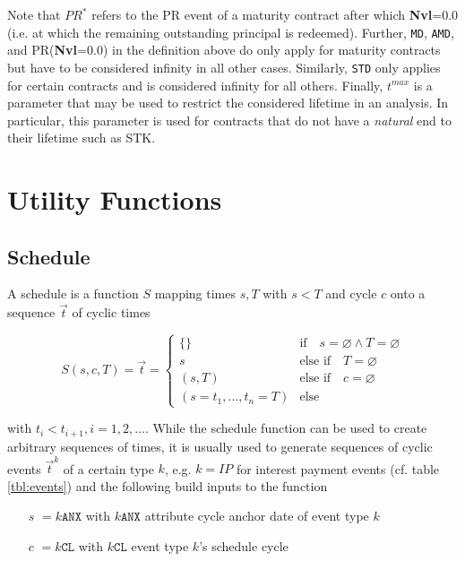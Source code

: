 \documentclass[9pt,oneside]{amsart}
\newcommand{\attr}[1]{\texttt{#1}}
\newcommand{\sdl}[3]{S(#1,#2,#3)}
\newcommand{\undef}{\varnothing}
\newcommand{\tmax}{t^{max}}
\begin{document}
\begin{multicols}{2}
Note that $PR^*$ refers to the PR event of a maturity contract after which \textbf{Nvl}=0.0 (i.e. at which the remaining outstanding principal is redeemed). Further, \attr{MD}, \attr{AMD}, and PR(\textbf{Nvl}=0.0) in the definition above do only apply for maturity contracts but have to be considered infinity in all other cases. Similarly, \attr{STD} only applies for certain contracts and is considered infinity for all others. Finally, $\tmax$ is a parameter that may be used to restrict the considered lifetime in an analysis. In particular, this parameter is used for contracts that do not have a \textit{natural} end to their lifetime such as STK.



\section{Utility Functions}\label{sec:utils}


\subsection{Schedule}\label{sec:schedule}

A schedule is a function $S$ mapping times $s,T$ with $s<T$ and cycle $c$ onto a sequence $\vec{t}$ of cyclic times

\[
	\sdl{s}{c}{T}=\vec{t}=\begin{cases} \{\} & \text{if}\quad s=\undef\land T=\undef\\
					s & \text{else if}\quad T=\undef\\
					(s,T) & \text{else if}\quad c=\undef\\
					(s=t_1,...,t_n=T) & \text{else} \end{cases}
\]

with $t_i<t_{i+1}, i=1,2,...$. While the schedule function can be used to create arbitrary sequences of times, it is usually used to generate sequences of cyclic events $\vec{t}^k$ of a certain type $k$, e.g. $k=IP$ for interest payment events (cf. table \ref{tbl:events}) and the following build inputs to the function

\begin{itemize}
	\item[$s$] $=k\attr{ANX}$ with $k\attr{ANX}$ attribute cycle anchor date of event type $k$

	\item[$c$] $=k\attr{CL}$ with $k\attr{CL}$ event type $k$'s schedule cycle


\end{itemize}
\end{multicols}
\end{document}
